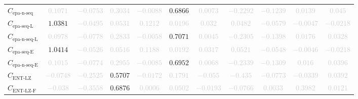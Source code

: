 \documentclass{standalone}
\newcommand{\entlempelzivname}{\text{ENT-LZ}}
\newcommand{\entlempelziv}{C_{\entlempelzivname}}
\newcommand{\entlempelzivflatname}{\text{ENT-LZ-F}}
\newcommand{\entlempelzivflat}{C_{\entlempelzivflatname}}
\newcommand{\epanormsequencename}{\text{epa-n-seq}}
\newcommand{\epanormsequence}{C_{\epanormsequencename}}
\newcommand{\epasequencelname}{\text{epa-seq-L}}
\newcommand{\epasequencel}{C_{\epasequencelname}}
\newcommand{\epanormsequencelname}{\text{epa-n-seq-L}}
\newcommand{\epanormsequencel}{C_{\epanormsequencelname}}
\newcommand{\epasequenceename}{\text{epa-seq-E}}
\newcommand{\epasequencee}{C_{\epasequenceename}}
\newcommand{\epanormsequenceename}{\text{epa-n-seq-E}}
\newcommand{\epanormsequencee}{C_{\epanormsequenceename}}
\begin{document}
\begin{tabular}{lcccccccccc}
$\epanormsequence$ & \textcolor{lightgray}{$0.1071$} & \textcolor{lightgray}{$-0.0753$} & \textcolor{lightgray}{$0.3034$} & \textcolor{lightgray}{$-0.0088$} & $0.6866$ & \textcolor{lightgray}{$0.0073$} & \textcolor{lightgray}{$-0.2292$} & \textcolor{lightgray}{$-0.1239$} & \textcolor{lightgray}{$0.0139$} & \textcolor{lightgray}{$0.045$} \\ 
$\epasequencel$ & $1.0381$ & \textcolor{lightgray}{$-0.0495$} & \textcolor{lightgray}{$0.0531$} & \textcolor{lightgray}{$0.1212$} & \textcolor{lightgray}{$0.0196$} & \textcolor{lightgray}{$0.032$} & \textcolor{lightgray}{$0.0482$} & \textcolor{lightgray}{$-0.0579$} & \textcolor{lightgray}{$-0.0047$} & \textcolor{lightgray}{$-0.0218$} \\ 
$\epanormsequencel$ & \textcolor{lightgray}{$0.0978$} & \textcolor{lightgray}{$-0.0778$} & \textcolor{lightgray}{$0.2833$} & \textcolor{lightgray}{$-0.0058$} & $0.7071$ & \textcolor{lightgray}{$0.0045$} & \textcolor{lightgray}{$-0.2305$} & \textcolor{lightgray}{$-0.1398$} & \textcolor{lightgray}{$0.0176$} & \textcolor{lightgray}{$0.0328$} \\ 
$\epasequencee$ & $1.0414$ & \textcolor{lightgray}{$-0.0526$} & \textcolor{lightgray}{$0.0516$} & \textcolor{lightgray}{$0.1188$} & \textcolor{lightgray}{$0.0192$} & \textcolor{lightgray}{$0.0317$} & \textcolor{lightgray}{$0.0521$} & \textcolor{lightgray}{$-0.0548$} & \textcolor{lightgray}{$-0.0046$} & \textcolor{lightgray}{$-0.0218$} \\ 
$\epanormsequencee$ & \textcolor{lightgray}{$0.1015$} & \textcolor{lightgray}{$-0.0774$} & \textcolor{lightgray}{$0.2955$} & \textcolor{lightgray}{$-0.0085$} & $0.6952$ & \textcolor{lightgray}{$0.0068$} & \textcolor{lightgray}{$-0.2339$} & \textcolor{lightgray}{$-0.1309$} & \textcolor{lightgray}{$0.016$} & \textcolor{lightgray}{$0.0396$} \\ 
$\entlempelziv$ & \textcolor{lightgray}{$-0.0748$} & \textcolor{lightgray}{$-0.2525$} & $0.5707$ & \textcolor{lightgray}{$-0.0172$} & \textcolor{lightgray}{$0.1791$} & \textcolor{lightgray}{$-0.055$} & \textcolor{lightgray}{$-0.435$} & \textcolor{lightgray}{$-0.0773$} & \textcolor{lightgray}{$-0.0339$} & \textcolor{lightgray}{$0.0392$} \\ 
$\entlempelzivflat$ & \textcolor{lightgray}{$-0.038$} & \textcolor{lightgray}{$-0.3558$} & $0.6876$ & \textcolor{lightgray}{$0.0006$} & \textcolor{lightgray}{$0.0502$} & \textcolor{lightgray}{$-0.0193$} & \textcolor{lightgray}{$-0.0766$} & \textcolor{lightgray}{$0.0033$} & \textcolor{lightgray}{$0.3982$} & \textcolor{lightgray}{$0.0121$} \\ 

\end{tabular}
\end{document}
